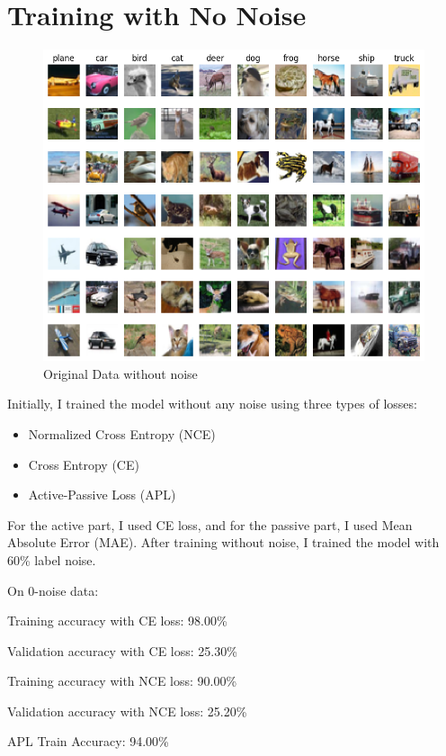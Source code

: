 \documentclass{article}
\begin{document}
\section*{Training with No Noise}
\begin{figure}[htbp]
    \centering
    \includegraphics[width=\linewidth]{original_data.png}  %
    \caption{Original Data without noise}
\end{figure}

Initially, I trained the model without any noise using three types of losses:
\begin{itemize}
    \item Normalized Cross Entropy (NCE)
    \item Cross Entropy (CE)
    \item Active-Passive Loss (APL)
\end{itemize}

For the active part, I used CE loss, and for the passive part, I used Mean Absolute Error (MAE). After training without noise, I trained the model with 60\% label noise.

On 0-noise data:

Training accuracy with CE loss: 98.00\%

Validation accuracy with CE loss: 25.30\%

Training accuracy with NCE loss: 90.00\%

Validation accuracy with NCE loss: 25.20\%

APL Train Accuracy: 94.00\%
\end{document}
